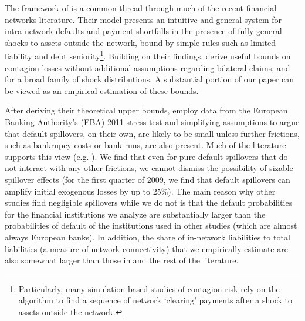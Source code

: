 The framework of \citet{eisenberg2001systemic} is a common thread through much of the recent financial networks literature. Their model presents an intuitive and general system for intra-network defaults and payment shortfalls in the presence of fully general shocks to assets outside the network, bound by simple rules such as limited liability and debt seniority\footnote{Particularly, many simulation-based studies of contagion risk rely on the \citet{eisenberg2001systemic} algorithm to find a sequence of network `clearing' payments after a shock to assets outside the network.}. Building on their findings, \citet{glasserman2015likely} derive useful bounds on contagion losses without additional assumptions regarding bilateral claims, and for a broad family of shock distributions. A substantial portion of our paper can be viewed as an empirical estimation of these bounds. 

After deriving their theoretical upper bounds, \citet{glasserman2015likely} employ data from the European Banking Authority's (EBA) 2011 stress test and simplifying assumptions to argue that default spillovers, on their own, are likely to be small unless further frictions, such as bankrupcy costs or bank runs, are also present. Much of the literature supports this view (e.g. \citet{upper2004estimating}). We find that even for pure default spillovers that do not interact with any other frictions, we cannot dismiss the possibility of sizable spillover effects (for the first quarter of 2009, we find that default spillovers can amplify initial exogenous losses by up to 25\%). The main reason why other studies find negligible spillovers while we do not is that the default probabilities for the financial institutions we analyze are substantially larger than the probabilities of default of the institutions used in other studies (which are almost always European banks). In addition, the share of in-network liabilities to total liabilities (a measure of network connectivity) that we empirically estimate are also somewhat larger than those in \citet{glasserman2015likely} and the rest of the literature.

